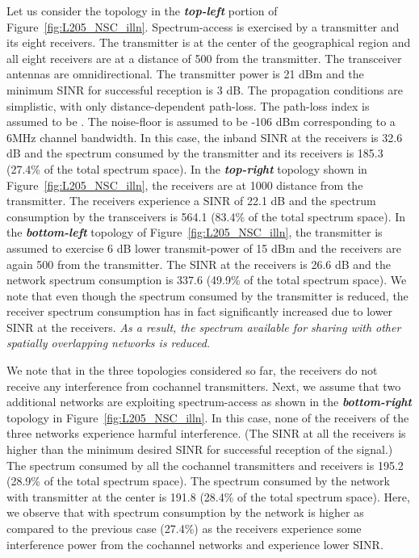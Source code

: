 \documentclass[12pt, draftclsnofoot, onecolumn]{IEEEtran}
\begin{document}
Let us consider the topology in the \textbf{\textit{top-left}} portion of Figure~\ref{fig:L205_NSC_illn}. Spectrum-access is exercised by a transmitter and its eight receivers. The transmitter is at the center of the geographical region and all eight receivers are at a distance of 500  from the transmitter. The transceiver antennas are omnidirectional. The transmitter power is 21 dBm and the minimum SINR for successful reception is 3 dB. The propagation conditions are simplistic, with only distance-dependent path-loss. The path-loss index is assumed to be . The noise-floor is assumed to be -106 dBm corresponding to a 6MHz channel bandwidth. In this case, the inband SINR at the receivers is 32.6 dB and the spectrum consumed by the transmitter and its receivers is 185.3  (27.4\% of the total spectrum space). In the \textbf{\textit{top-right}} topology shown in Figure~\ref{fig:L205_NSC_illn}, the receivers are at 1000  distance from the transmitter. The receivers experience a SINR of 22.1 dB and the spectrum consumption by the transceivers is 564.1  (83.4\% of the total spectrum space). In the \textbf{\textit{bottom-left}} topology of Figure~\ref{fig:L205_NSC_illn}, the transmitter is assumed to exercise 6 dB lower transmit-power of 15 dBm and the receivers are again 500  from the transmitter. The SINR at the receivers is 26.6 dB and the network spectrum consumption is 337.6  (49.9\% of the total spectrum space). We note that even though the spectrum consumed by the transmitter is reduced, the receiver spectrum consumption has in fact significantly increased due to lower SINR at the receivers. \textit{As a result, the spectrum available for sharing with other spatially overlapping networks is reduced. }

We note that in the three topologies considered so far, the receivers do not receive any interference from cochannel transmitters. Next, we assume that two additional networks are exploiting spectrum-access as shown in the \textbf{\textit{bottom-right}} topology in Figure~\ref{fig:L205_NSC_illn}. In this case, none of the receivers of the three networks experience harmful interference. (The SINR at all the receivers is higher than the minimum desired SINR for successful reception of the signal.) The spectrum consumed by all the cochannel transmitters and receivers is 195.2  (28.9\% of the total spectrum space). The spectrum consumed by the network with transmitter at the center is 191.8  (28.4\% of the total spectrum space). Here, we observe that with spectrum consumption by the network is higher as compared to the previous case (27.4\%) as the receivers experience some interference power from the cochannel networks and experience lower SINR.
\end{document}
